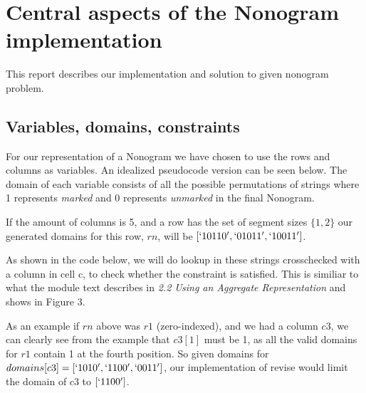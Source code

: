 
\section{Central aspects of the Nonogram implementation}
This report describes our implementation and solution to given nonogram problem.

\subsection{Variables, domains, constraints}
For our representation of a Nonogram we have chosen to
use the rows and columns as variables. An idealized pseudocode
version can be seen below. The domain of each variable consists
of all the possible permutations of strings where 1 represents
\emph{marked} and 0 represents \emph{unmarked} in the final Nonogram.

If the amount of columns is 5, and a row has the set of segment
sizes \(\{1, 2\}\) our generated domains for this row, \(rn\), will be
\([`10110', `01011', `10011']\).

As shown in the code below, we will do lookup in these strings
crosschecked with a column in cell c, to check whether the constraint
is satisfied. This is similiar to what the module text describes in
\emph{2.2 Using an Aggregate Representation} and shows in Figure 3.

As an example if \(rn\) above was \(r1\) (zero-indexed), and we had a column
\(c3\), we can clearly see from the example that \(c3[1]\) must be 1, as all the
valid domains for \(r1\) contain 1 at the fourth position. So given domains
for \(domains[c3] = [`1010', `1100', `0011']\), our implementation of revise
would limit the domain of \(c3\) to \([`1100']\).



